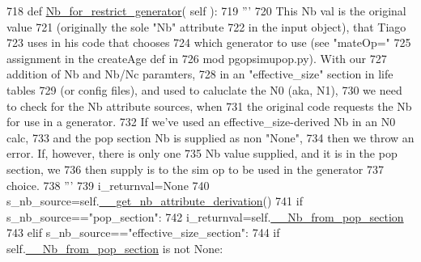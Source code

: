 \begin{DoxyCode}
718     \textcolor{keyword}{def }\hyperlink{classnegui_1_1pginputsimupop_1_1PGInputSimuPop_ac788ef76c43e7e8faca73a1ee82b6da4}{Nb\_for\_restrict\_generator}( self ):
719         \textcolor{stringliteral}{'''}
720 \textcolor{stringliteral}{        This Nb val is the original value}
721 \textcolor{stringliteral}{        (originally the sole "Nb" attribute}
722 \textcolor{stringliteral}{        in the input object), that Tiago }
723 \textcolor{stringliteral}{        uses in his code that chooses}
724 \textcolor{stringliteral}{        which generator to use (see "mateOp="}
725 \textcolor{stringliteral}{        assignment in the createAge def in}
726 \textcolor{stringliteral}{        mod pgopsimupop.py).  With our}
727 \textcolor{stringliteral}{        addition of Nb and Nb/Nc  paramters,}
728 \textcolor{stringliteral}{        in an "effective\_size" section in life tables}
729 \textcolor{stringliteral}{        (or config files), and used to caluclate the N0 (aka, N1),}
730 \textcolor{stringliteral}{        we need to check for the Nb attribute sources, when}
731 \textcolor{stringliteral}{        the original code requests the Nb for use in a generator.}
732 \textcolor{stringliteral}{        If we've used an effective\_size-derived Nb in an N0 calc, }
733 \textcolor{stringliteral}{        and the pop section Nb is supplied as non "None",}
734 \textcolor{stringliteral}{        then we throw an error.  If, however, there is only one}
735 \textcolor{stringliteral}{        Nb value supplied, and it is in the pop section, we }
736 \textcolor{stringliteral}{        then supply is to the sim op to be used in the generator}
737 \textcolor{stringliteral}{        choice.}
738 \textcolor{stringliteral}{        '''}
739         i\_returnval=\textcolor{keywordtype}{None}
740         s\_nb\_source=self.\hyperlink{classnegui_1_1pginputsimupop_1_1PGInputSimuPop_ab22ca7220fa560cf8c7b4d8b6bcb87f3}{\_\_get\_nb\_attribute\_derivation}()
741         \textcolor{keywordflow}{if} s\_nb\_source==\textcolor{stringliteral}{"pop\_section"}:
742             i\_returnval=self.\hyperlink{classnegui_1_1pginputsimupop_1_1PGInputSimuPop_a2525ee53b93e309b99914e0cdf175901}{\_\_Nb\_from\_pop\_section}
743         \textcolor{keywordflow}{elif} s\_nb\_source==\textcolor{stringliteral}{"effective\_size\_section"}:
744             \textcolor{keywordflow}{if} self.\hyperlink{classnegui_1_1pginputsimupop_1_1PGInputSimuPop_a2525ee53b93e309b99914e0cdf175901}{\_\_Nb\_from\_pop\_section} \textcolor{keywordflow}{is} \textcolor{keywordflow}{not} \textcolor{keywordtype}{None}:

\end{DoxyCode}
